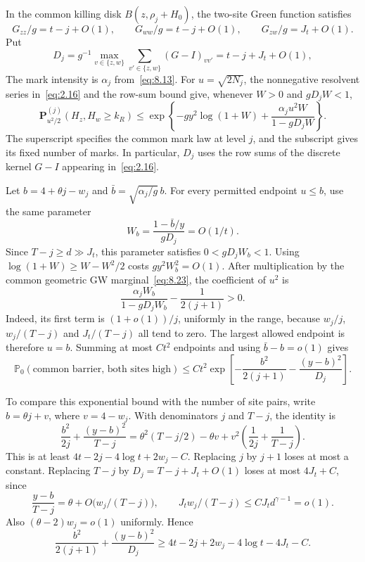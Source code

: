 \documentclass[11pt,letterpaper,reqno]{amsart}
\numberwithin{equation}{section}
\theoremstyle{remark}
\begin{document}
In the common killing disk $B(z,\rho_j+H_0)$, the two-site Green function satisfies
\[
G_{zz}/g=t-j+O(1),\qquad G_{ww}/g=t-j+O(1),\qquad
G_{zw}/g=J_t+O(1).
\]
Put
\begin{equation}\label{eq:9.8}
D_j=g^{-1}\max_{v\in\{z,w\}}
\sum_{v'\in\{z,w\}}(G-I)_{vv'}
=t-j+J_t+O(1),
\end{equation}
The mark intensity is $\alpha_j$ from~\eqref{eq:8.13}. For $u=\sqrt{2N_j}$, the nonnegative resolvent series in~\eqref{eq:2.16} and the row-sum bound give, whenever $W>0$ and $gD_jW<1$,
\begin{equation}\label{eq:9.9}
\mathbf P_{u^2/2}^{(j)}(H_z,H_w\ge k_R)
\le\exp\left\{-gy^2\log(1+W)
+\frac{\alpha_j u^2W}{1-gD_jW}\right\}.
\end{equation}
The superscript specifies the common mark law at level $j$, and the subscript gives its fixed number of marks. In particular, $D_j$ uses the row sums of the discrete kernel $G-I$ appearing in~\eqref{eq:2.16}.

Let $b=4+\theta j-w_j$ and $\bar b=\sqrt{\alpha_j/g}\,b$. For every permitted endpoint $u\le b$, use the same parameter
\begin{equation}\label{eq:9.10}
W_b=\frac{1-\bar b/y}{gD_j}=O(1/t).
\end{equation}
Since $T-j\ge d\gg J_t$, this parameter satisfies $0<gD_jW_b<1$. Using $\log(1+W)\ge W-W^2/2$ costs $gy^2W_b^2=O(1)$. After multiplication by the common geometric GW marginal~\eqref{eq:8.23}, the coefficient of $u^2$ is
\[
\frac{\alpha_jW_b}{1-gD_jW_b}-\frac1{2(j+1)}>0.
\]
Indeed, its first term is $(1+o(1))/j$, uniformly in the range, because
$w_j/j$, $w_j/(T-j)$ and $J_t/(T-j)$ all tend to zero. The largest allowed endpoint is therefore $u=b$. Summing at most $Ct^2$ endpoints and using $\bar b-b=o(1)$ gives
\begin{equation}\label{eq:9.11}
\mathbb P_0(\text{common barrier, both sites high})
\le Ct^2\exp\left[-\frac{b^2}{2(j+1)}-\frac{(y-b)^2}{D_j}\right].
\end{equation}

To compare this exponential bound with the number of site pairs, write $b=\theta j+v$, where $v=4-w_j$. With denominators $j$ and $T-j$, the identity is
\begin{equation}\label{eq:9.12}
\frac{b^2}{2j}+\frac{(y-b)^2}{T-j}
=\theta^2(T-j/2)-\theta v
+v^2\left(\frac1{2j}+\frac1{T-j}\right).
\end{equation}
This is at least $4t-2j-4\log t+2w_j-C$. Replacing $j$ by $j+1$ loses at most a constant. Replacing $T-j$ by
$D_j=T-j+J_t+O(1)$ loses at most $4J_t+C$, since
\[
\frac{y-b}{T-j}=\theta+O\bigl(w_j/(T-j)\bigr),
\qquad J_t w_j/(T-j)\le C J_t d^{\gamma-1}=o(1).
\]
Also $(\theta-2)w_j=o(1)$ uniformly. Hence
\begin{equation}\label{eq:9.13}
\frac{b^2}{2(j+1)}+\frac{(y-b)^2}{D_j}
\ge4t-2j+2w_j-4\log t-4J_t-C.
\end{equation}
\end{document}

